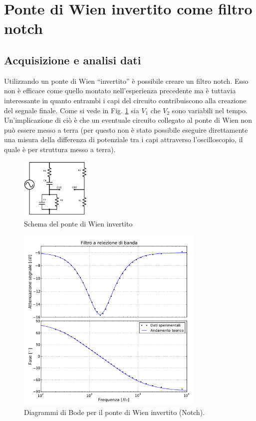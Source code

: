 \section{Ponte di Wien invertito come filtro notch}
\subsection{Acquisizione e analisi dati}
Utilizzando un ponte di Wien ``invertito'' è possibile creare un filtro notch. Esso non è efficace come quello montato nell'esperienza precedente ma è tuttavia interessante in quanto entrambi i capi del circuito contribuiscono alla creazione del segnale finale. Come si vede in Fig. \ref{fig:Winv} sia $V_1$ che $V_2$ sono variabili nel tempo. Un'implicazione di ciò è che un eventuale circuito collegato al ponte di Wien non può essere messo a terra (per questo non è stato possibile eseguire direttamente una misura della differenza di potenziale tra i capi attraverso l'oscilloscopio, il quale è per struttura messo a terra).
\begin{figure}
	\centering
    \includegraphics[width=0.30\textwidth]{schema2.pdf}
    \caption{Schema del ponte di Wien invertito}
    \label{fig:Winv}
\end{figure}

\begin{figure}
    \includegraphics[width=90mm]{notch.pdf}
    \caption{Diagrammi di Bode per il ponte di Wien invertito \phantom {trollolollo} (Notch).}
    \label{fig:notch}
\end{figure}


